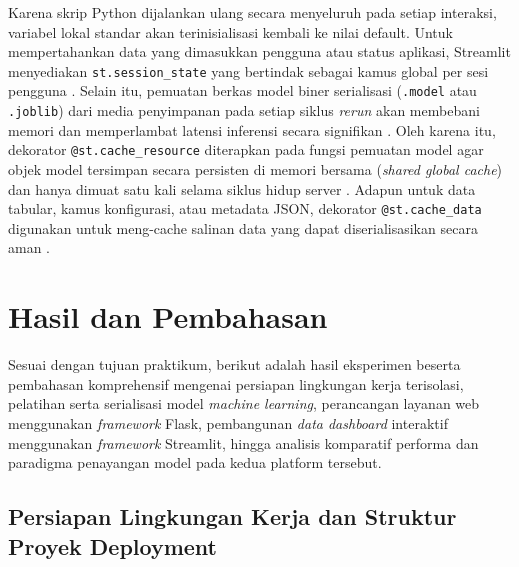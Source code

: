 \documentclass[a4paper,oneside,11pt]{book}
\begin{document}
\par Karena skrip Python dijalankan ulang secara menyeluruh pada setiap interaksi, variabel lokal standar akan terinisialisasi kembali ke nilai default. Untuk mempertahankan data yang dimasukkan pengguna atau status aplikasi, Streamlit menyediakan \texttt{st.session\_state} yang bertindak sebagai kamus global per sesi pengguna \cite{streamlit_execution_model}. Selain itu, pemuatan berkas model biner serialisasi (\texttt{.model} atau \texttt{.joblib}) dari media penyimpanan pada setiap siklus \textit{rerun} akan membebani memori dan memperlambat latensi inferensi secara signifikan \cite{streamlit_caching}. Oleh karena itu, dekorator \texttt{@st.cache\_resource} diterapkan pada fungsi pemuatan model agar objek model tersimpan secara persisten di memori bersama (\textit{shared global cache}) dan hanya dimuat satu kali selama siklus hidup server \cite{streamlit_caching}. Adapun untuk data tabular, kamus konfigurasi, atau metadata JSON, dekorator \texttt{@st.cache\_data} digunakan untuk meng-cache salinan data yang dapat diserialisasikan secara aman \cite{streamlit_caching}.


\section{Hasil dan Pembahasan}

\par Sesuai dengan tujuan praktikum, berikut adalah hasil eksperimen beserta pembahasan komprehensif mengenai persiapan lingkungan kerja terisolasi, pelatihan serta serialisasi model \textit{machine learning}, perancangan layanan web menggunakan \textit{framework} Flask, pembangunan \textit{data dashboard} interaktif menggunakan \textit{framework} Streamlit, hingga analisis komparatif performa dan paradigma penayangan model pada kedua platform tersebut.

\subsection{Persiapan Lingkungan Kerja dan Struktur Proyek Deployment}
\end{document}
